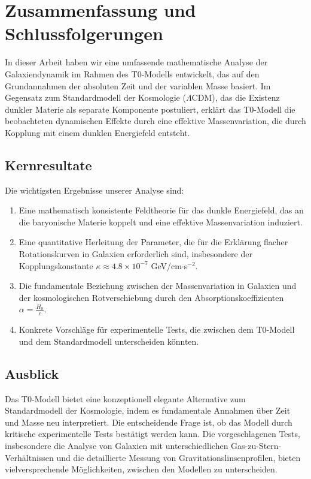 \documentclass[a4paper,12pt]{article}
\begin{document}
	\section{Zusammenfassung und Schlussfolgerungen}
	
	In dieser Arbeit haben wir eine umfassende mathematische Analyse der Galaxiendynamik im Rahmen des T0-Modells entwickelt, das auf den Grundannahmen der absoluten Zeit und der variablen Masse basiert. Im Gegensatz zum Standardmodell der Kosmologie ($\Lambda$CDM), das die Existenz dunkler Materie als separate Komponente postuliert, erklärt das T0-Modell die beobachteten dynamischen Effekte durch eine effektive Massenvariation, die durch Kopplung mit einem dunklen Energiefeld entsteht.
	
	\subsection{Kernresultate}
	
	Die wichtigsten Ergebnisse unserer Analyse sind:
	
	\begin{enumerate}
		\item Eine mathematisch konsistente Feldtheorie für das dunkle Energiefeld, das an die baryonische Materie koppelt und eine effektive Massenvariation induziert.
		
		\item Eine quantitative Herleitung der Parameter, die für die Erklärung flacher Rotationskurven in Galaxien erforderlich sind, insbesondere der Kopplungskonstante $\kappa \approx 4.8 \times 10^{-7}$ GeV/cm$\cdot$s$^{-2}$.
		
		\item Die fundamentale Beziehung zwischen der Massenvariation in Galaxien und der kosmologischen Rotverschiebung durch den Absorptionskoeffizienten $\alpha = \frac{H_0}{c}$.
		
		\item Konkrete Vorschläge für experimentelle Tests, die zwischen dem T0-Modell und dem Standardmodell unterscheiden könnten.
	\end{enumerate}
	
	\subsection{Ausblick}
	
	Das T0-Modell bietet eine konzeptionell elegante Alternative zum Standardmodell der Kosmologie, indem es fundamentale Annahmen über Zeit und Masse neu interpretiert. Die entscheidende Frage ist, ob das Modell durch kritische experimentelle Tests bestätigt werden kann. Die vorgeschlagenen Tests, insbesondere die Analyse von Galaxien mit unterschiedlichen Gas-zu-Stern-Verhältnissen und die detaillierte Messung von Gravitationslinsenprofilen, bieten vielversprechende Möglichkeiten, zwischen den Modellen zu unterscheiden.
	
\end{document}
